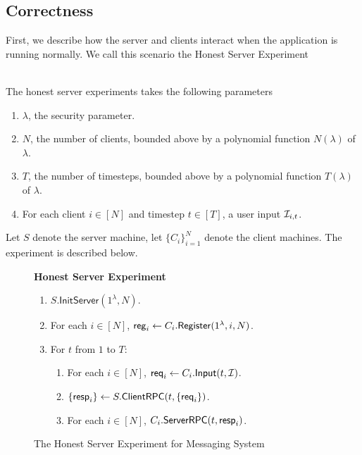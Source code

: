 \subsection{Correctness}
\label{subsec:messaging-correctness}
First, we describe how the server and clients interact when the application is running normally. We call this scenario the Honest Server Experiment

\begin{definition}  \hfill\\
\label{defn:messaging-honest-server-experiment}
The honest server experiments takes the following parameters

\begin{enumerate}
    \item $\lambda$, the security parameter.
    \item $N$, the number of clients, bounded above by a polynomial function $N(\lambda)$ of $\lambda$.
    \item $T$, the number of timesteps, bounded above by a polynomial function $T(\lambda)$ of $\lambda$.
    \item For each client $i \in [N]$ and timestep $t \in [T]$, a user input $\mathcal{I}_{i, t}$.
\end{enumerate}

Let $S$ denote the server machine, let $\{C_i\}_{i = 1}^N$ denote the client machines. The experiment is described below.
\begin{figure}[ht!]
\begin{framed}
\textbf{Honest Server Experiment}
\begin{enumerate}
\item $S.\mathsf{InitServer}(1^{\lambda}, N)$. 
\item For each $i \in [N]$, $\mathsf{reg}_i \leftarrow C_i.\mathsf{Register}(1^{\lambda}, i, N)$. 
\item For $t$ from $1$ to $T$:
    \begin{enumerate}
    \item For each $i \in [N]$, $\mathsf{req}_i \leftarrow C_i.\mathsf{Input}(t, \mathcal{I})$.
    
    \item $\{\mathsf{resp}_i\} \leftarrow S.\mathsf{ClientRPC}(t, \{\mathsf{req}_i\})$.
    
    \item For each $i \in [N]$, $C_i.\mathsf{ServerRPC}(t, \mathsf{resp}_i)$.
    \end{enumerate}
\end{enumerate}
\end{framed}
\caption{The Honest Server Experiment for Messaging System}
\label{expr:messaging-honest-server}
\end{figure}

\end{definition}

